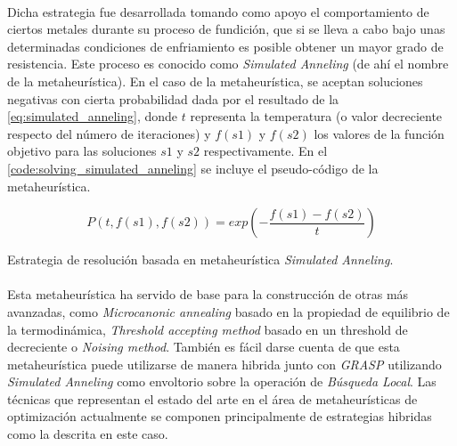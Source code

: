 \documentclass{subfiles}
\begin{document}
        \paragraph{}
        Dicha estrategia fue desarrollada tomando como apoyo el comportamiento de ciertos metales durante su proceso de fundición, que si se lleva a cabo bajo unas determinadas condiciones de enfriamiento es posible obtener un mayor grado de resistencia. Este proceso es conocido como \emph{Simulated Anneling} (de ahí el nombre de la metaheurística). En el caso de la metaheurística, se aceptan soluciones negativas con cierta probabilidad dada por el resultado de la \cref{eq:simulated_anneling}, donde $t$ representa la temperatura (o valor decreciente respecto del número de iteraciones) y $f(s1)$ y $f(s2)$ los valores de la función objetivo para las soluciones $s1$ y $s2$ respectivamente. En el \cref{code:solving_simulated_anneling} se incluye el pseudo-código de la metaheurística.

        \begin{equation}
          \label{eq:simulated_anneling}
          P(t, f(s1), f(s2)) = exp\left(-\frac{f(s1) - f(s2)}{t}\right)
        \end{equation}

        \begin{algorithm}[ht]
          \SetAlgoLined
          \caption{Estrategia de resolución basada en metaheurística \emph{Simulated Anneling}.}
          \label{code:solving_simulated_anneling}
        \end{algorithm}
      
        \paragraph{}
        Esta metaheurística ha servido de base para la construcción de otras más avanzadas, como \emph{Microcanonic annealing} basado en la propiedad de equilibrio de la termodinámica, \emph{Threshold accepting method} basado en un threshold de decreciente o \emph{Noising method}. También es fácil darse cuenta de que esta metaheurística puede utilizarse de manera hibrida junto con \emph{GRASP} utilizando \emph{Simulated Anneling} como envoltorio sobre la operación de \emph{Búsqueda Local}. Las técnicas que representan el estado del arte en el área de metaheurísticas de optimización actualmente se componen principalmente de estrategias hibridas como la descrita en este caso. 
\end{document}
